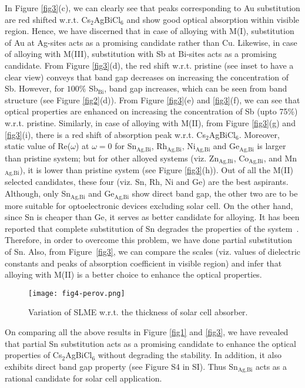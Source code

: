 \documentclass[journal=jpclcd,manuscript=letter]{achemso}
\begin{document}
In Figure \ref{fig3}(c), we can clearly see that peaks corresponding to Au substitution are red shifted w.r.t. Cs$_2$AgBiCl$_6$ and show good optical absorption within visible region. Hence, we have discerned that in case of alloying with M(I), substitution of Au at Ag-sites acts as a promising candidate rather than Cu. Likewise, in case of alloying with M(III), substitution with Sb at Bi-sites acts as a promising candidate. From Figure \ref{fig3}(d), the red shift w.r.t. pristine (see inset to have a clear view) conveys that band gap decreases on increasing the concentration of Sb. However, for $100\%$ Sb$_{\textrm{Bi}}$, band gap increases, which can be seen from band structure (see Figure \ref{fig2}(d)). From Figure \ref{fig3}(e) and \ref{fig3}(f), we can see that optical properties are enhanced on increasing the concentration of Sb (upto 75\%) w.r.t. pristine. Similarly, in case of alloying with M(II), from Figure \ref{fig3}(g) and \ref{fig3}(i), there is a red shift of absorption peak w.r.t. Cs$_2$AgBiCl$_6$. Moreover, static value of Re($\omega$) at $\omega=0$ for Sn$_{\textrm{Ag},\textrm{Bi}}$, Rh$_{\textrm{Ag},\textrm{Bi}}$, Ni$_{\textrm{Ag},\textrm{Bi}}$ and Ge$_{\textrm{Ag},\textrm{Bi}}$ is larger than pristine system; but for other alloyed systems (viz. Zn$_{\textrm{Ag},\textrm{Bi}}$, Co$_{\textrm{Ag},\textrm{Bi}}$, and Mn$_{\textrm{Ag},\textrm{Bi}}$), it is lower than pristine system (see Figure \ref{fig3}(h)). Out of all the M(II) selected candidates, these four (viz. Sn, Rh, Ni and Ge) are the best aspirants. Although, only Sn$_{\textrm{Ag},\textrm{Bi}}$ and Ge$_{\textrm{Ag},\textrm{Bi}}$  show direct band gap, the other two are to be more suitable for optoelectronic devices excluding solar cell. On the other hand, since Sn is cheaper than Ge, it serves as better candidate for alloying. It has been reported that complete substitution of Sn degrades the properties of the system~\cite{S1,S2}. Therefore, in order to overcome this problem, we have done partial substitution of Sn. Also, from Figure~\ref{fig3}, we can compare the scales (viz. values of dielectric constants and peaks of absorption coefficient in visible region) and infer that alloying with M(II) is a better choice to enhance the optical properties.
\begin{figure}
	\texttt{[image: fig4-perov.png]}
	\caption{Variation of SLME w.r.t. the thickness of solar cell absorber.}
	\label{fig4}
\end{figure}
On comparing all the above results in Figure \ref{fig1} and \ref{fig3}, we have revealed that partial Sn substitution acts as a promising candidate to enhance the optical properties of Cs$_2$AgBiCl$_6$ without degrading the stability. In addition, it also exhibits direct band gap property (see Figure S4 in SI). Thus Sn$_{\textrm{Ag},\textrm{Bi}}$ acts as a rational candidate for solar cell application.
\end{document}
